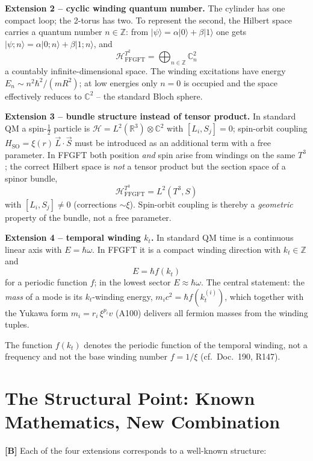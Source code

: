 \textbf{Extension 2 -- cyclic winding quantum number.} The cylinder has one compact
loop; the 2-torus has two. To represent the second, the Hilbert space carries a
quantum number $n\in\mathbb{Z}$: from $|\psi\rangle = \alpha|0\rangle+\beta|1\rangle$
one gets $|\psi;n\rangle = \alpha|0;n\rangle+\beta|1;n\rangle$, and
\[
  \boxed{\;\mathcal{H}^{T^2}_{\text{FFGFT}} = \bigoplus_{n\in\mathbb{Z}}\mathbb{C}^2_n\;}
\]
a countably infinite-dimensional space. The winding excitations have energy
$E_n\sim n^2\hbar^2/(mR^2)$; at low energies only $n=0$ is occupied and the space
effectively reduces to $\mathbb{C}^2$ -- the standard Bloch sphere.

\textbf{Extension 3 -- bundle structure instead of tensor product.} In standard
QM a spin-$\tfrac12$ particle is $\mathcal{H} = L^2(\mathbb{R}^3)\otimes\mathbb{C}^2$
with $[L_i,S_j]=0$; spin-orbit coupling $H_{\text{SO}}=\xi(r)\,\vec L\cdot\vec S$
must be introduced as an additional term with a free parameter. In FFGFT both
position \emph{and} spin arise from windings on the same $T^3$; the correct
Hilbert space is \emph{not} a tensor product but the section space of a spinor
bundle,
\[
  \boxed{\;\mathcal{H}^{T^3}_{\text{FFGFT}} = L^2(T^3, S)\;}
\]
with $[L_i,S_j]\neq0$ (corrections $\sim\xi$). Spin-orbit coupling is thereby a
\emph{geometric} property of the bundle, not a free parameter.

\textbf{Extension 4 -- temporal winding $k_t$.} In standard QM time is a
continuous linear axis with $E=\hbar\omega$. In FFGFT it is a compact winding
direction with $k_t\in\mathbb{Z}$ and
\[
  \boxed{\;E = \hbar f(k_t)\;}
\]
for a periodic function $f$; in the lowest sector $E\approx\hbar\omega$. The
central statement: the \emph{mass} of a mode is its $k_t$-winding energy,
$m_i c^2 = \hbar f(k_t^{(i)})$, which together with the Yukawa form
$m_i = r_i\,\xi^{p_i}v$ (A100) delivers all fermion masses from the winding
tuples.

The function $f(k_t)$ denotes the periodic function of the temporal winding, not a frequency and not the base winding number $f = 1/\xi$ (cf.\ Doc.~190, R147).

\section{The Structural Point: Known Mathematics, New Combination}

\textbf{[B]} Each of the four extensions corresponds to a well-known structure:

